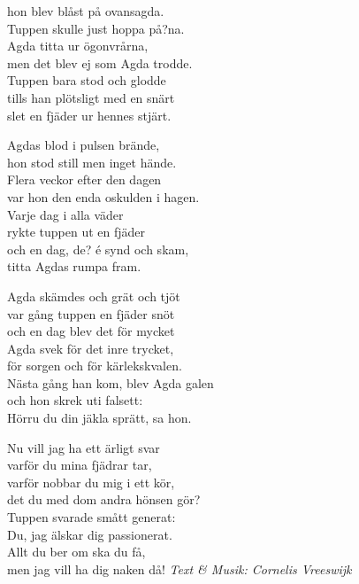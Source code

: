 hon blev blåst på ovansagda.\\
Tuppen skulle just hoppa på?na.\\
Agda titta ur ögonvrårna,\\
men det blev ej som Agda trodde.\\
Tuppen bara stod och glodde\\
tills han plötsligt med en snärt\\
slet en fjäder ur hennes stjärt.\par
\vspace{10pt}
Agdas blod i pulsen brände,\\
hon stod still men inget hände.\\
Flera veckor efter den dagen\\
var hon den enda oskulden i hagen.\\
Varje dag i alla väder\\
rykte tuppen ut en fjäder\\
och en dag, de? é synd och skam,\\
titta Agdas rumpa fram.\par
\vspace{10pt}
Agda skämdes och grät och tjöt\\
var gång tuppen en fjäder snöt\\
och en dag blev det för mycket\\
Agda svek för det inre trycket,\\
för sorgen och för kärlekskvalen.\\
Nästa gång han kom, blev Agda galen\\
och hon skrek uti falsett:\\
Hörru du din jäkla sprätt, sa hon.\par
\vspace{10pt}
Nu vill jag ha ett ärligt svar\\
varför du mina fjädrar tar,\\
varför nobbar du mig i ett kör,\\
det du med dom andra hönsen gör?\\
Tuppen svarade smått generat:\\
Du, jag älskar dig passionerat.\\
Allt du ber om ska du få,\\
men jag vill ha dig naken då!
\vspace{10pt}
{\footnotesize\textit{Text \& Musik: Cornelis Vreeswijk}}
